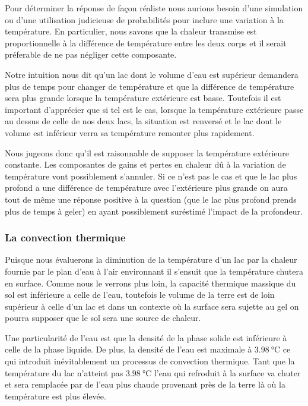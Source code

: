 \documentclass[12pt]{article}
\begin{document}
Pour d\'eterminer la r\'eponse de fa\c con r\'ealiste nous aurions besoin d'une simulation ou d'une
utilisation judicieuse de probabilit\'es pour inclure une variation \`a la temp\'erature. En particulier,
nous savons que la chaleur transmise est proportionnelle \`a la diff\'erence de temp\'erature entre les
deux corps\cite{Fourier} et il serait pr\'eferable de ne pas n\'egliger cette composante.

Notre intuition nous dit qu'un lac dont le volume d'eau est sup\'erieur demandera plus de temps pour
changer de temp\'erature et que la diff\'erence de temp\'erature sera plus grande lorsque la
temp\'erature ext\'erieure est basse. Toutefois il est important d'appr\'ecier que si tel est le cas,
lorsque la temp\'erature ext\'erieure passe au dessus de celle de nos deux lacs, la situation est
renvers\'e et le lac dont le volume est inf\'erieur verra sa temp\'erature remonter plus rapidement.

Nous jugeons donc qu'il est raisonnable de supposer la temp\'erature ext\'erieure constante. Les
composantes de gains et pertes en chaleur d\^u \`a la variation de temp\'erature vont possiblement
s'annuler. Si ce n'est pas le cas et que le lac plus profond a une diff\'erence de temp\'erature avec
l'ext\'erieure plus grande on aura tout de m\^eme une r\'eponse positive \`a la question (que le lac plus
profond prends plus de temps \`a geler) en ayant possiblement sur\'estim\'e l'impact de la profondeur.

\subsubsection{La convection thermique}

Puisque nous \'evaluerons la diminution de la temp\'erature d'un lac par la chaleur fournie par le plan
d'eau \`a l'air environnant il s'ensuit que la temp\'erature chutera en surface. Comme nous le verrons
plus loin, la capacit\'e thermique\cite{CapTherm} massique du sol est inf\'erieure a celle de l'eau,
toutefois le volume de la terre est de loin sup\'erieur \`a celle d'un lac et dans un contexte o\`u la
surface sera sujette au gel on pourra supposer que le sol sera une source de chaleur.

Une particularit\'e de l'eau est que la densit\'e de la phase solide est inf\'erieure \`a celle de la
phase liquide. De plus, la densit\'e de l'eau est maximale \`a $\SI{3.98}{\celsius}$ ce qui introduit
in\'evitablement un processus de convection thermique\cite{ConvNat}. Tant que la temp\'erature du lac
n'atteint pas $\SI{3.98}{\celsius}$ l'eau qui refroduit \`a la surface va chuter et sera remplac\'ee par
de l'eau plus chaude provenant pr\`es de la terre l\`a o\`u la temp\'erature est plus \'elev\'ee.
\end{document}
